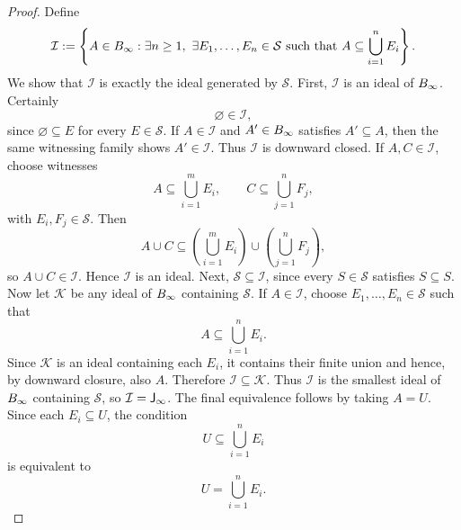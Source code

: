 \begin{proof}
	Define
	\[
		\mathcal I
		:=
		\left\{
		A\in B_\infty:
		\exists n\ge1,\ \exists E_1,\dots,E_n\in\mathcal S
		\text{ such that }
		A\subseteq \bigcup_{i=1}^n E_i
		\right\}.
	\]
	We show that \(\mathcal I\) is exactly the ideal generated by
	\(\mathcal S\).
	First, \(\mathcal I\) is an ideal of \(B_\infty\). Certainly
	\[
		\varnothing\in\mathcal I,
	\]
	since \(\varnothing\subseteq E\) for every \(E\in\mathcal S\). If
	\(A\in\mathcal I\) and \(A'\in B_\infty\) satisfies \(A'\subseteq A\),
	then the same witnessing family shows \(A'\in\mathcal I\). Thus
	\(\mathcal I\) is downward closed. If \(A,C\in\mathcal I\), choose
	witnesses
	\[
		A\subseteq \bigcup_{i=1}^m E_i,
		\qquad
		C\subseteq \bigcup_{j=1}^n F_j,
	\]
	with \(E_i,F_j\in\mathcal S\). Then
	\[
		A\cup C
		\subseteq
		\left(\bigcup_{i=1}^m E_i\right)\cup
		\left(\bigcup_{j=1}^n F_j\right),
	\]
	so \(A\cup C\in\mathcal I\). Hence \(\mathcal I\) is an ideal.
	Next, \(\mathcal S\subseteq\mathcal I\), since every \(S\in\mathcal S\)
	satisfies \(S\subseteq S\).
	Now let \(\mathcal K\) be any ideal of \(B_\infty\) containing
	\(\mathcal S\). If \(A\in\mathcal I\), choose \(E_1,\dots,E_n\in\mathcal S\)
	such that
	\[
		A\subseteq \bigcup_{i=1}^n E_i.
	\]
	Since \(\mathcal K\) is an ideal containing each \(E_i\), it contains
	their finite union and hence, by downward closure, also \(A\). Therefore
	\(\mathcal I\subseteq\mathcal K\).
	Thus \(\mathcal I\) is the smallest ideal of \(B_\infty\) containing
	\(\mathcal S\), so \(\mathcal I=\mathsf J_\infty\).
	The final equivalence follows by taking \(A=U\). Since each
	\(E_i\subseteq U\), the condition
	\[
		U\subseteq \bigcup_{i=1}^n E_i
	\]
	is equivalent to
	\[
		U=\bigcup_{i=1}^n E_i.
	\]
\end{proof}
